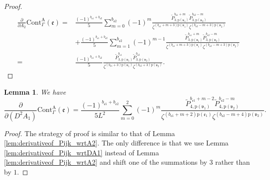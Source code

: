 \documentclass[12pt]{amsart}
\newtheorem{lem}[prop]{Lemma}
\numberwithin{equation}{section}
\begin{document}
\begin{proof}
\begin{equation*}
\begin{aligned}
    \frac{\partial}{\partial A_2}\mathrm{Cont}_{\Gamma}^{\mathrm{A}}(\mathfrak{e})
    =&\frac{(-1)^{b_{\mathfrak{e}1}+b_{\mathfrak{e}2}}}{5} \sum_{m=0}^{b_{\mathfrak{e}2}}(-1)^{m} \frac{\widetilde{P}_{3,\mathrm{p}(\mathfrak{v}_1)}^{b_{\mathfrak{e}1}+m}\widetilde{P}_{3,\mathrm{p}(\mathfrak{v}_2)}^{b_{\mathfrak{e}2}-m}}{\zeta^{(b_{\mathfrak{e}1}+m+3)\mathrm{p}(\mathfrak{v}_1)}\zeta^{(b_{\mathfrak{e}2}-m+3)\mathrm{p}(\mathfrak{v}_2)}}\\
    &+\frac{(-1)^{b_{\mathfrak{e}1}+b_{\mathfrak{e}2}}}{5} \sum_{m=1}^{b_{\mathfrak{e}2}}(-1)^{m-1} \frac{\widetilde{P}_{3,\mathrm{p}(\mathfrak{v}_1)}^{b_{\mathfrak{e}1}+m}\widetilde{P}_{3,\mathrm{p}(\mathfrak{v}_2)}^{b_{\mathfrak{e}2}-m}}{\zeta^{(b_{\mathfrak{e}1}+m+3)\mathrm{p}(\mathfrak{v}_1)}\zeta^{(b_{\mathfrak{e}2}-m+3)\mathrm{p}(\mathfrak{v}_2)}}\\
    =&\frac{(-1)^{b_{\mathfrak{e}1}+b_{\mathfrak{e}2}}}{5} \frac{\widetilde{P}_{3,\mathrm{p}(\mathfrak{v}_1)}^{b_{\mathfrak{e}1}}\widetilde{P}_{3,\mathrm{p}(\mathfrak{v}_2)}^{b_{\mathfrak{e}2}}}{\zeta^{(b_{\mathfrak{e}1}+3)\mathrm{p}(\mathfrak{v}_1)}\zeta^{(b_{\mathfrak{e}2}+3)\mathrm{p}(\mathfrak{v}_2)}}.
\end{aligned}
\end{equation*}
\end{proof}


\begin{lem}\label{lem:DA^21_derivative_of_edge}
We have
\begin{equation*}
    \frac{\partial}{\partial (D^2A_1)}\mathrm{Cont}_{\Gamma}^{\mathrm{A}}(\mathfrak{e})
    =\frac{(-1)^{b_{\mathfrak{e}1}+b_{\mathfrak{e}2}}}{5L^2}
    \sum_{m=0}^2(-1)^m\frac{\widetilde{P}_{4,\mathrm{p}(\mathfrak{v}_1)}^{b_{\mathfrak{e}1}+m-2}\widetilde{P}_{4,\mathrm{p}(\mathfrak{v}_2)}^{b_{\mathfrak{e}2}-m}}{\zeta^{(b_{\mathfrak{e}1}+m+2)\mathrm{p}(\mathfrak{e}_1)}\zeta^{(b_{\mathfrak{e}2}-m+4)\mathrm{p}(\mathfrak{v}_2)}}.
\end{equation*}
\end{lem}
\begin{proof}
The strategy of proof is similar to that of Lemma \ref{lem:derivativeof_Pijk_wrtA2}. The only difference is that we use Lemma \ref{lem:derivativeof_Pijk_wrtDA1} instead of Lemma \ref{lem:derivativeof_Pijk_wrtA2} and shift one of the summations by $3$ rather than by $1$.
\end{proof}
\end{document}
